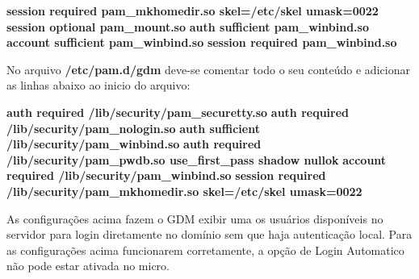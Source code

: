\textbf{session required pam_mkhomedir.so skel=/etc/skel umask=0022}
\textbf{session optional pam_mount.so}
\textbf{auth sufficient pam_winbind.so}
\textbf{account sufficient pam_winbind.so}
\textbf{session required pam_winbind.so}

No arquivo \textbf{/etc/pam.d/gdm} deve-se comentar todo o seu conteúdo e adicionar as linhas abaixo ao inicio do arquivo:

\textbf{auth required /lib/security/pam_securetty.so}
\textbf{auth required /lib/security/pam_nologin.so}
\textbf{auth sufficient /lib/security/pam_winbind.so}
\textbf{auth required /lib/security/pam_pwdb.so use_first_pass shadow nullok}
\textbf{account required /lib/security/pam_winbind.so}
\textbf{session required /lib/security/pam_mkhomedir.so skel=/etc/skel umask=0022}

As configurações acima fazem o GDM exibir uma os usuários disponíveis no servidor para login diretamente no domínio sem que haja autenticação local. Para as configurações acima funcionarem corretamente, a opção de Login Automatico não pode estar ativada no micro. 